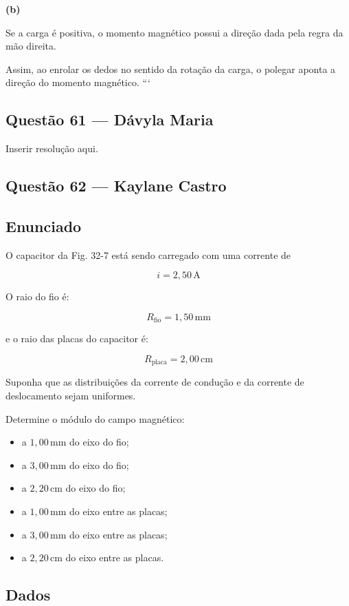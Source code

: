 \documentclass[12pt,a4paper]{article}
\begin{document}
\textbf{(b)}

Se a carga é positiva, o momento magnético possui a direção dada pela regra da mão direita.

Assim, ao enrolar os dedos no sentido da rotação da carga, o polegar aponta a direção do momento magnético.
```


\subsection{Questão 61 — Dávyla Maria}
Inserir resolução aqui.

\subsection{Questão 62 — Kaylane Castro}
\subsection*{Enunciado}

O capacitor da Fig. 32-7 está sendo carregado com uma corrente de

\[
i = 2,50\,\text{A}
\]

O raio do fio é:

\[
R_{\text{fio}} = 1,50\,\text{mm}
\]

e o raio das placas do capacitor é:

\[
R_{\text{placa}} = 2,00\,\text{cm}
\]

Suponha que as distribuições da corrente de condução e da corrente de
deslocamento sejam uniformes.

Determine o módulo do campo magnético:

\begin{itemize}
    \item[(a)] a $1,00\,\text{mm}$ do eixo do fio;
    \item[(b)] a $3,00\,\text{mm}$ do eixo do fio;
    \item[(c)] a $2,20\,\text{cm}$ do eixo do fio;
    \item[(d)] a $1,00\,\text{mm}$ do eixo entre as placas;
    \item[(e)] a $3,00\,\text{mm}$ do eixo entre as placas;
    \item[(f)] a $2,20\,\text{cm}$ do eixo entre as placas.
\end{itemize}


\subsection*{Dados}
\end{document}
